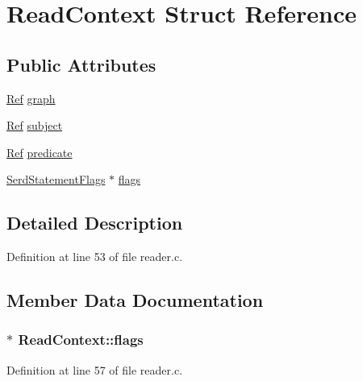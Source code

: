 \hypertarget{struct_read_context}{}\section{Read\+Context Struct Reference}
\label{struct_read_context}
\subsection*{Public Attributes}
\begin{DoxyCompactItemize}
\item 
\hyperlink{reader_8c_ae3e9b21450ad93b7e7f8e5be89e2d8db}{Ref} \hyperlink{struct_read_context_a709b5a59c90f78414910f39045fd75e5}{graph}
\item 
\hyperlink{reader_8c_ae3e9b21450ad93b7e7f8e5be89e2d8db}{Ref} \hyperlink{struct_read_context_af01726bf3cdcea0c7d9181780c0f9792}{subject}
\item 
\hyperlink{reader_8c_ae3e9b21450ad93b7e7f8e5be89e2d8db}{Ref} \hyperlink{struct_read_context_afc93d6c14a830fbd358031bf6af40679}{predicate}
\item 
\hyperlink{group__serd_ga77f5ab7cef4fbc88591eaa9970fcddad}{Serd\+Statement\+Flags} $\ast$ \hyperlink{struct_read_context_aed36def2b4ab49bffc8d09a722328831}{flags}
\end{DoxyCompactItemize}


\subsection{Detailed Description}


Definition at line 53 of file reader.\+c.



\subsection{Member Data Documentation}
\subsubsection[{\texorpdfstring{flags}{flags}}]{$\ast$ Read\+Context\+::flags}\hypertarget{struct_read_context_aed36def2b4ab49bffc8d09a722328831}{}\label{struct_read_context_aed36def2b4ab49bffc8d09a722328831}


Definition at line 57 of file reader.\+c.

